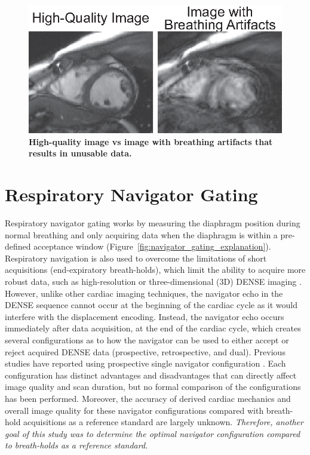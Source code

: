 	\begin{figure}
		\centering
		\includegraphics{figures/intro/good_bad_image_breathing_artifacts}
		\caption[High-quality image vs image with breathing artifacts that results in unusable data]{\textbf{High-quality image vs image with breathing artifacts that results in unusable data.}}
		\label{fig:good_bad_image_breathing_artifacts}
	\end{figure}

\section{Respiratory Navigator Gating}
	Respiratory navigator gating works by measuring the diaphragm position during normal breathing and only acquiring data when the diaphragm is within a pre-defined acceptance window (Figure~\ref{fig:navigator_gating_explanation}). Respiratory navigation is also used to overcome the limitations of short acquisitions (end-expiratory breath-holds), which limit the ability to acquire more robust data, such as high-resolution \cite{Wehner2014} or three-dimensional (3D) DENSE imaging \cite{Zhong2010a,Kar2014,Auger2012}. However, unlike other cardiac imaging techniques, the navigator echo in the DENSE sequence cannot occur at the beginning of the cardiac cycle as it would interfere with the displacement encoding. Instead, the navigator echo occurs immediately after data acquisition, at the end of the cardiac cycle, which creates several configurations as to how the navigator can be used to either accept or reject acquired DENSE data (prospective, retrospective, and dual). Previous studies have reported using prospective single navigator configuration \cite{Zhong2010a,Auger2012}. Each configuration has distinct advantages and disadvantages that can directly affect image quality and scan duration, but no formal comparison of the configurations has been performed. Moreover, the accuracy of derived cardiac mechanics and overall image quality for these navigator configurations compared with breath-hold acquisitions as a reference standard are largely unknown. \textit{Therefore, another goal of this study was to determine the optimal navigator configuration compared to breath-holds as a reference standard.}
	
